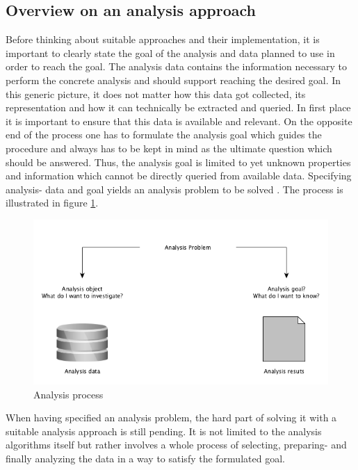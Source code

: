 \subsection{Overview on an analysis approach}
Before thinking about suitable approaches and their implementation, it is important to clearly state the goal of the analysis and data planned to use in order to reach the goal. The analysis data contains the information necessary to perform the concrete analysis and should support reaching the desired goal. In this generic picture, it does not matter how this data got collected, its representation and how it can technically be extracted and queried. In first place it is important to ensure that this data is available and relevant. On the opposite end of the process one has to formulate the analysis goal which guides the procedure and always has to be kept in mind as the ultimate question which should be answered. Thus, the analysis goal is limited to yet unknown properties and information which cannot be directly queried from available data. Specifying analysis- data and goal yields an analysis problem to be solved \cite{neckel2015} \cite{knobloch2000data}. The process is illustrated in figure \ref{fig:analysisProcess}.

\begin{figure}
	\centering
	\includegraphics[width=1.0\textwidth]{img/analysis.png}
	\caption{Analysis process \cite{neckel2015}}
	\label{fig:analysisProcess}
\end{figure} 

When having specified an analysis problem, the hard part of solving it with a suitable analysis approach is still pending. It is not limited to the analysis algorithms itself but rather involves a whole process of selecting, preparing- and finally analyzing the data in a way to satisfy the formulated goal. 

